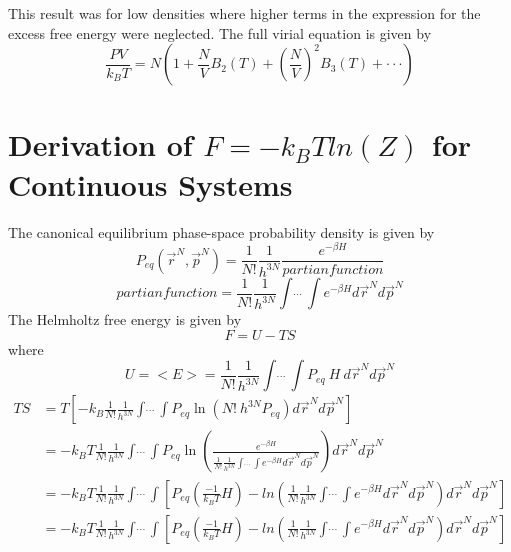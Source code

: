 \documentclass[double,12pt]{beavtex}
\begin{document}
This result was for low densities where higher terms in the 
expression for the excess free energy were neglected. The full virial 
equation is given by
\begin{equation}\frac{PV}{k_BT}=N\left(1+\frac{N}{V}B_2(T)+\left(\frac{N}{V}\right)^2B_3(T)+ \cdot\cdot\cdot\right) \end{equation}


\section{Derivation of $F = -k_BTln(Z)$ for Continuous Systems}
The canonical equilibrium phase-space probability density is given by
\begin{equation}P_{eq}(\vec r^N, \vec p^N)=\frac{1}{N!}\frac{1}{h^{3N}}\frac{e^{-\beta H}}{partian function}\end{equation}
\begin{equation}{partian function}=\frac{1}{N!}\frac{1}{h^{3N}}\int\dot~\dot~\dot~\int e^{-\beta H} d\vec r^{N} d\vec p^{N}\end{equation}
The Helmholtz free energy is given by 
\begin{equation}\label{F=U-TS}F = U - TS\end{equation}
where
\begin{equation}U = <E> = \frac{1}{N!}\frac{1}{h^{3N}}\int\dot~\dot~\dot~\int P_{eq}~H~d\vec r^{N} d\vec p^{N}\end{equation}
\begin{align}
 TS &= T\left[-k_B\frac{1}{N!}\frac{1}{h^{3N}}\int\dot~\dot~\dot~\int P_{eq}\operatorname{ln}\left(N!~h^{3N}P_{eq}\right) d\vec r^{N} d\vec p^{N}\right]   \\
	&= -k_BT\frac{1}{N!}\frac{1}{h^{3N}}\int\dot~\dot~\dot~\int P_{eq}\operatorname{ln}\left(\frac{e^{-\beta H}}{\frac{1}{N!}\frac{1}{h^{3N}}\int\dot~\dot~\dot~\int e^{-\beta H} d\vec r^{N} d\vec p^{N}}\right) d\vec r^{N} d\vec p^{N}   \\
	&= -k_BT\frac{1}{N!}\frac{1}{h^{3N}}\int\dot~\dot~\dot~\int \left[P_{eq}\left(\frac{-1}{k_BT}H\right)-ln\left(\frac{1}{N!}\frac{1}{h^{3N}}\int\dot~\dot~\dot~\int e^{-\beta H} d\vec r^{N} d\vec p^{N}\right) d\vec r^{N} d\vec p^{N}\right]  \\ 
    &= -k_BT\frac{1}{N!}\frac{1}{h^{3N}}\int\dot~\dot~\dot~\int \left[P_{eq}\left(\frac{-1}{k_BT}H\right)-ln\left(\frac{1}{N!}\frac{1}{h^{3N}}\int\dot~\dot~\dot~\int e^{-\beta H} d\vec r^{N} d\vec p^{N}\right) d\vec r^{N} d\vec p^{N}\right]   
\end{align}  
\end{document}
